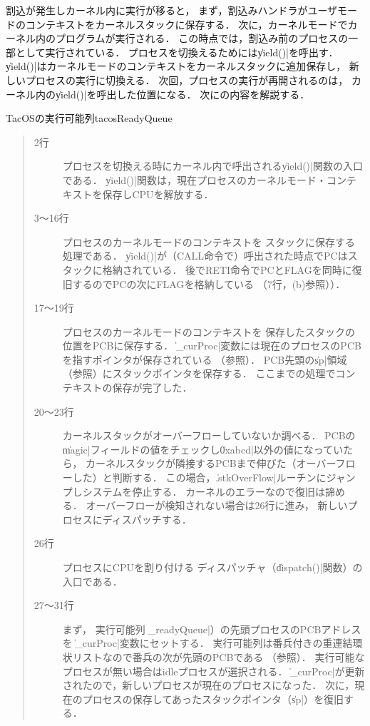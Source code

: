 割込が発生しカーネル内に実行が移ると，
まず，割込みハンドラがユーザモードのコンテキストをカーネルスタックに保存する．
次に，カーネルモードでカーネル内のプログラムが実行される．
この時点では，割込み前のプロセスの一部として実行されている．
プロセスを切換えるためには\|yield()|を呼出す．
\|yield()|はカーネルモードのコンテキストをカーネルスタックに追加保存し，
新しいプロセスの実行に切換える．
次回，プロセスの実行が再開されるのは，
カーネル内の\|yield()|を呼出した位置になる．
次にの内容を解説する．

{TacOSの実行可能列}{tacosReadyQueue}

\begin{quote}
\begin{description}
\item[2行] プロセスを切換える時にカーネル内で呼出される\|yield()|関数の入口である．
\|yield()|関数は，現在プロセスのカーネルモード・コンテキストを保存しCPUを解放する．

\item[3〜16行] プロセスのカーネルモードのコンテキストを
スタックに保存する処理である．
\|yield()|が（CALL命令で）呼出された時点でPCはスタックに格納されている．
後でRETI命令でPCとFLAGを同時に復旧するのでPCの次にFLAGを格納している
（7行，(b)参照））．

\item[17〜19行] プロセスのカーネルモードのコンテキストを
保存したスタックの位置をPCBに保存する．
\|_curProc|変数には現在のプロセスのPCBを指すポインタが保存されている
（参照）．
PCB先頭の\|sp|領域（参照）にスタックポインタを保存する．
ここまでの処理でコンテキストの保存が完了した．

\item[20〜23行] カーネルスタックがオーバーフローしていないか調べる．
PCBの\|magic|フィールドの値をチェックし\|0xabcd|以外の値になっていたら，
カーネルスタックが隣接するPCBまで伸びた（オーバーフローした）と判断する．
この場合，\|.stkOverFlow|ルーチンにジャンプしシステムを停止する．
カーネルのエラーなので復旧は諦める．
オーバーフローが検知されない場合は26行に進み，
新しいプロセスにディスパッチする．

\item[26行] プロセスにCPUを割り付ける
ディスパッチャ（\|dispatch()|関数）の入口である．

\item[27〜31行] まず，
実行可能列（\|_readyQueue|）の先頭プロセスのPCBアドレスを
\|_curProc|変数にセットする．
実行可能列は番兵付きの重連結環状リストなので番兵の次が先頭のPCBである
（参照）．
実行可能なプロセスが無い場合はidleプロセスが選択される．
\|_curProc|が更新されたので，新しいプロセスが現在のプロセスになった．
次に，現在のプロセスの保存してあったスタックポインタ（\|sp|）を復旧する．


\end{description}
\end{quote}
